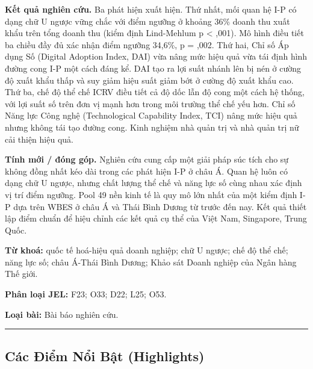 \documentclass[12pt,a4paper]{article}
\begin{document}
\textbf{Kết quả nghiên cứu.} Ba phát hiện xuất hiện. Thứ nhất, mối quan
hệ I-P có dạng chữ U ngược vững chắc với điểm ngưỡng ở khoảng 36\% doanh
thu xuất khẩu trên tổng doanh thu (kiểm định Lind-Mehlum p \textless{}
,001). Mô hình điều tiết ba chiều đầy đủ xác nhận điểm ngưỡng 34,6\%, p
= ,002. Thứ hai, Chỉ số Áp dụng Số (Digital Adoption Index, DAI) vừa
nâng mức hiệu quả vừa tái định hình đường cong I-P một cách đáng kể. DAI
tạo ra lợi suất nhánh lên bị nén ở cường độ xuất khẩu thấp và suy giảm
hiệu suất giảm bớt ở cường độ xuất khẩu cao. Thứ ba, chế độ thể chế ICRV
điều tiết cả độ dốc lẫn độ cong một cách hệ thống, với lợi suất số trên
đơn vị mạnh hơn trong môi trường thể chế yếu hơn. Chỉ số Năng lực Công
nghệ (Technological Capability Index, TCI) nâng mức hiệu quả nhưng không
tái tạo đường cong. Kinh nghiệm nhà quản trị và nhà quản trị nữ cải
thiện hiệu quả.

\textbf{Tính mới / đóng góp.} Nghiên cứu cung cấp một giải pháp súc tích
cho sự không đồng nhất kéo dài trong các phát hiện I-P ở châu Á. Quan hệ
luôn có dạng chữ U ngược, nhưng chất lượng thể chế và năng lực số cùng
nhau xác định vị trí điểm ngưỡng. Pool 49 nền kinh tế là quy mô lớn nhất
của một kiểm định I-P dựa trên WBES ở châu Á và Thái Bình Dương từ trước
đến nay. Kết quả thiết lập điểm chuẩn để hiệu chỉnh các kết quả cụ thể
của Việt Nam, Singapore, Trung Quốc.

\textbf{Từ khoá:} quốc tế hoá-hiệu quả doanh nghiệp; chữ U ngược; chế độ
thể chế; năng lực số; châu Á-Thái Bình Dương; Khảo sát Doanh nghiệp của
Ngân hàng Thế giới.

\textbf{Phân loại JEL:} F23; O33; D22; L25; O53.

\textbf{Loại bài:} Bài báo nghiên cứu.

\begin{center}\rule{0.5\linewidth}{0.5pt}\end{center}

\hypertarget{cuxe1c-ux111iux1ec3m-nux1ed5i-bux1eadt-highlights}{%
\subsection{Các Điểm Nổi Bật
(Highlights)}\label{cuxe1c-ux111iux1ec3m-nux1ed5i-bux1eadt-highlights}}
\end{document}
